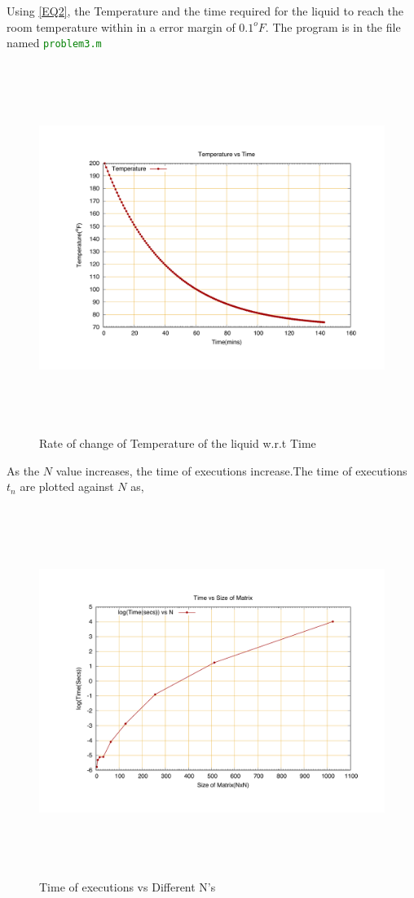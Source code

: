 \documentclass[fleqn,letterpaper,12pt]{report}
\begin{document}
Using \eqref{EQ2}, the Temperature and the time required for the liquid to reach the room temperature within in a error margin of $0.1^oF$. The program is in the file named {\tt{\textcolor{Green}{problem3.m}}}
\begin{figure}[ht!]
	\centering
	\includegraphics[height=120mm,width=160mm]{T.pdf}
	\caption{Rate of change of Temperature of the liquid w.r.t Time\label{overflow}}
\end{figure}

\newpage
{}
{}
\problem

As the $N$ value increases, the time of executions increase.The time of executions $t_n$ are plotted against $N$ as,

\begin{figure}[ht!]
	\centering
	\includegraphics[height=120mm,width=160mm]{matrix_multiply.pdf}
	\caption{Time of executions vs Different N's\label{overflow}}
\end{figure}
\end{document}
